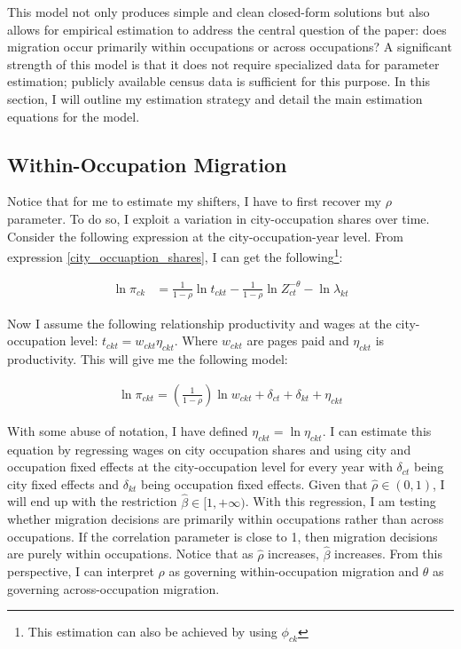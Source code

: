 \documentclass[10pt]{article}
\begin{document}
This model not only produces simple and clean closed-form solutions but also allows for empirical estimation to address the central question of the paper: does migration occur primarily within occupations or across occupations? A significant strength of this model is that it does not require specialized data for parameter estimation; publicly available census data is sufficient for this purpose. In this section, I will outline my estimation strategy and detail the main estimation equations for the model.

\subsection{Within-Occupation Migration}

Notice that for me to estimate my shifters, I have to first recover my $\rho$ parameter. To do so, I exploit a variation in city-occupation shares over time. Consider the following expression at the city-occupation-year level. From expression \ref{city_occuaption_shares}, I can get the following\footnote{This estimation can also be achieved by using $\phi_{ck}$}:

\begin{align*}
    \ln \pi_{ck} & = \frac{1}{1 - \rho} \ln t_{ckt} - \frac{1}{1 - \rho} \ln Z_{ct}^{- \theta} - \ln \lambda_{kt}
\end{align*}

Now I assume the following relationship productivity and wages at the city-occupation level: $t_{ckt} = w_{ckt} \eta_{ckt}$. Where $w_{ckt}$ are pages paid and $\eta_{ckt}$ is productivity. This will give me the following model:

\begin{align*}
    \ln \pi_{ckt} = \left( \frac{1}{1 - \rho} \right) \ln w_{ckt} + \delta_{ct} + \delta_{kt} + \eta_{ckt}
\end{align*}


With some abuse of notation, I have defined $\eta_{ckt} = \ln \eta_{ckt}$. I can estimate this equation by regressing wages on city occupation shares and using city and occupation fixed effects at the city-occupation level for every year with $\delta_{ct}$ being city fixed effects and $\delta_{kt}$ being occupation fixed effects. Given that $\hat{\rho} \in (0, 1)$, I will end up with the restriction $\hat{\beta} \in [1, +\infty)$. With this regression, I am testing whether migration decisions are primarily within occupations rather than across occupations. If the correlation parameter is close to 1, then migration decisions are purely within occupations. Notice that as $\hat{\rho}$ increases, $\hat{\beta}$ increases. From this perspective, I can interpret $\rho$ as governing within-occupation migration and $\theta$ as governing across-occupation migration.
\end{document}
